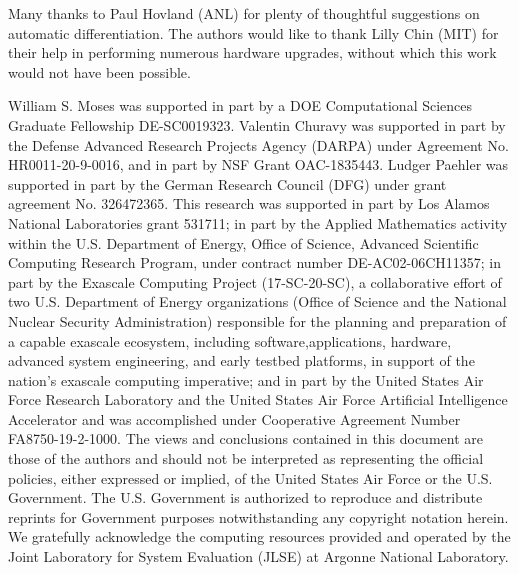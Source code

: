 
\begin{acks}
{
\small
Many thanks to Paul Hovland (ANL) for plenty of thoughtful suggestions on automatic differentiation.
The authors would like to thank Lilly Chin (MIT) for their help in performing numerous hardware upgrades, without which this work would not have been possible.



William S. Moses was supported in part by a DOE Computational Sciences Graduate Fellowship
DE-SC0019323. Valentin Churavy was supported in part by the Defense Advanced Research
Projects Agency (DARPA) under Agreement No. HR0011-20-9-0016, and in part by NSF Grant
OAC-1835443. Ludger Paehler was supported in part by the German Research Council (DFG) under grant agreement No. 326472365. This research was supported in part by Los Alamos National Laboratories grant
531711; in part by the Applied Mathematics activity within the U.S. Department of Energy, Office of Science, Advanced Scientific Computing Research Program, under contract number DE-AC02-06CH11357; in part by the Exascale Computing Project (17-SC-20-SC), a collaborative effort of two U.S. Department of Energy organizations (Office of Science and the National Nuclear Security Administration) responsible for the planning and preparation of a capable exascale ecosystem, including software,applications, hardware, advanced system engineering, and early testbed platforms, in support of the nation's exascale computing imperative; and in part by the United States Air Force Research Laboratory and the United States Air Force Artificial Intelligence Accelerator and was accomplished under Cooperative Agreement Number FA8750-19-2-1000. The views and conclusions contained in this document are those of the authors and should not be interpreted as representing the official policies, either expressed or implied, of the United States Air Force or the U.S. Government. The U.S. Government is authorized to reproduce and distribute reprints for Government purposes notwithstanding any copyright notation herein. We gratefully acknowledge the computing resources provided and operated by the Joint Laboratory for System Evaluation (JLSE) at Argonne National Laboratory.


}
\end{acks}
